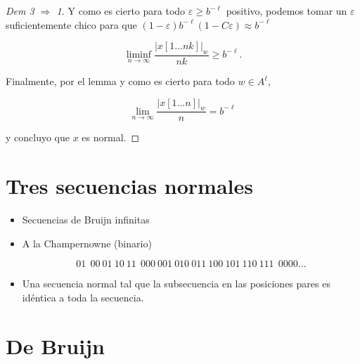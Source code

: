 \documentclass{report}
\theoremstyle{definition} %
\begin{document}
\begin{proof}[Dem 3 $\Rightarrow$ 1]
    Y como es cierto para todo $\varepsilon \geq b^{-\ell}$ positivo, podemos tomar
    un $\varepsilon$ suficientemente chico para que $(1 - \varepsilon)
    b^{-\ell}(1 - C\varepsilon) \approx b^{-\ell}$



    $$\liminf_{n\to \infty} \frac{|x[1\dots nk]|_w}{nk} \geq b^{-\ell}.$$

    Finalmente, por el lemma  y como es cierto para todo
    $w \in A^\ell$,

    $$\lim_{n \to \infty} \frac{|x[1\dots n]|_w}{n} = b^{-\ell}$$

    y concluyo que $x$ es normal.
\end{proof}



\section{Tres secuencias normales}

\begin{itemize}
    \item Secuencias de Bruijn infinitas
    \item A la Champernowne (binario)
    
    $$01\ \ 00\ 01\ 10\ 11\ \ 000\ 001\ 010\ 011\ 100\ 101\ 110\ 111\ \ 0000 \dots$$

    \item Una secuencia normal tal que la subsecuencia en las posiciones pares
    es idéntica a toda la secuencia.
\end{itemize}

\section{De Bruijn}
\end{document}
